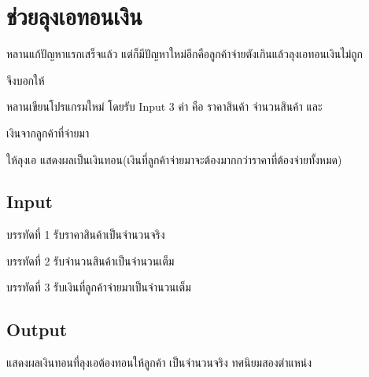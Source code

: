 \documentclass{article}
\begin{document}
\section*{ช่วยลุงเอทอนเงิน}

หลานแก้ปัญหาแรกเสร็จแล้ว แต่ก็มีปัญหาใหม่อีกคือลูกค้าจ่ายตังเกินแล้วลุงเอทอนเงินไม่ถูก

จึงบอกให้



หลานเขียนโปรแกรมใหม่ โดยรับ Input 3 ค่า คือ ราคาสินค้า จำนวนสินค้า และ

เงินจากลูกค้าที่จ่ายมา



ให้ลุงเอ แสดงผลเป็นเงินทอน(เงินที่ลูกค้าจ่ายมาจะต้องมากกว่าราคาที่ต้องจ่ายทั้งหมด)



\subsection*{Input}
บรรทัดที่ 1 รับราคาสินค้าเป็นจำนวนจริง



บรรทัดที่ 2 รับจำนวนสินค้าเป็นจำนวนเต็ม



บรรทัดที่ 3 รับเงินที่ลูกค้าจ่ายมาเป็นจำนวนเต็ม



\subsection*{Output}
{แสดงผลเงินทอนที่ลุงเอต้องทอนให้ลูกค้า เป็นจำนวนจริง ทศนิยมสองตำแหน่ง}\\
\end{document}
